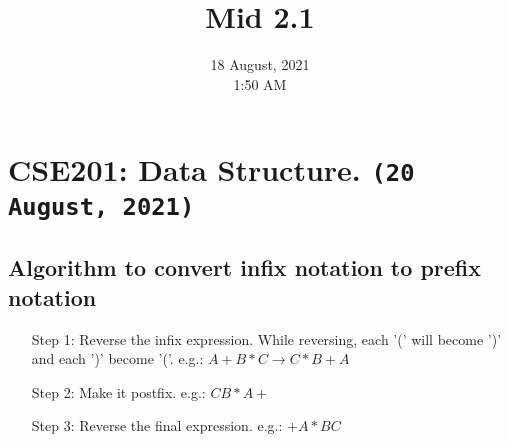 \documentclass[11pt]{article}
\title{Mid 2.1}
\author{\myName}
\date{18 August, 2021 \\ 1:50 AM}
\begin{document}
\maketitle

\section*{CSE201: Data Structure. \texttt{(20 August, 2021)}}
\subsection*{Algorithm to convert infix notation to prefix notation}
\begin{enumerate}
	\item[Step 1:] Reverse the infix expression. While reversing, each '(' will become ')' and each ')' become '('. e.g.: $A+B*C \rightarrow C*B+A$
	\item[Step 2:] Make it postfix. e.g.: $CB*A+$
	\item[Step 3:] Reverse the final expression. e.g.: $+A*BC$
\end{enumerate}

\pagebreak
\end{document}
